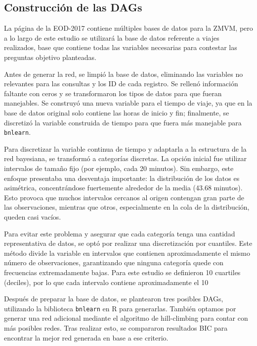 \documentclass[eng]{ajceam-class}
\begin{document}
\subsection{Construcción de las DAGs}

La página de la EOD-2017 contiene múltiples bases de datos para la ZMVM, pero a lo largo de este estudio se utilizará la base de datos referente a viajes realizados, base que contiene todas las variables necesarias para contestar las preguntas objetivo planteadas. 

Antes de generar la red, se limpió la base de datos, eliminando las variables no relevantes para las consultas y los ID de cada registro. Se rellenó información faltante con ceros y se transformaron los tipos de datos para que fueran manejables. Se construyó una nueva variable para el tiempo de viaje, ya que en la base de datos original solo contiene las horas de inicio y fin; finalmente, se discretizó la variable construida de tiempo para que fuera más manejable para \texttt{bnlearn}. 

Para discretizar la variable continua de tiempo y adaptarla a la estructura de la red bayesiana, se transformó a categorías discretas. La opción inicial fue utilizar intervalos de tamaño fijo (por ejemplo, cada 20 minutos). Sin embargo, este enfoque presentaba una desventaja importante: la distribución de los datos es asimétrica, concentrándose fuertemente alrededor de la media (43.68 minutos). Esto provoca que muchos intervalos cercanos al origen contengan gran parte de las observaciones, mientras que otros, especialmente en la cola de la distribución, queden casi vacíos.

Para evitar este problema y asegurar que cada categoría tenga una cantidad representativa de datos, se optó por realizar una discretización por cuantiles. Este método divide la variable en intervalos que contienen aproximadamente el mismo número de observaciones, garantizando que ninguna categoría quede con frecuencias extremadamente bajas. Para este estudio se definieron 10 cuartiles (deciles), por lo que cada intervalo contiene aproximadamente el 10%


Después de preparar la base de datos, se plantearon tres posibles DAGs, utilizando la biblioteca \texttt{bnlearn} en R para generarlas. También optamos por generar una red adicional mediante el algoritmo de hill-climbing para contar con más posibles redes. Tras realizar esto, se compararon resultados BIC para encontrar la mejor red generada en base a ese criterio.
\end{document}
